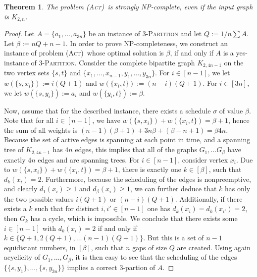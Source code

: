 \documentclass[10pt,a4paper]{article}
\newtheorem{theorem}{Theorem}[section]
\numberwithin{equation}{section}
\newcommand{\set}[1]{\{ #1 \}}
\newcommand{\fromto}[2]{\set{#1, \ldots, #2}}
\newcommand{\act}{\textsc{(Act)}}
\DeclareMathOperator{\val}{\text{value}}
\begin{document}
\begin{theorem}
The problem \act\ is strongly NP-complete, even if the input graph is $K_{2,n}$.
\end{theorem}
\begin{proof}
Let $A = \fromto{a_1}{a_{3n}}$ be an instance of \textsc{3-Partition} and let $Q := 1/n \sum A$. Let $\beta := nQ + n - 1$. In order to prove NP-completeness, we construct an instance of problem \act\ whose optimal solution is $\beta$, if and only if $A$ is a yes-instance of \textsc{3-Partition}. Consider the  complete bipartite graph $K_{2,4n-1}$ on the two vertex sets $\set{s, t}$ and $\set{x_1, \ldots, x_{n-1}, y_1, \ldots, y_{3n}}$. For $i \in [n-1]$, we let $w(\set{s,x_i}) := i(Q + 1)$ and $w(\set{x_i,t}) := (n - i)(Q + 1)$. For $i \in [3n]$, we let $w(\set{s,y_i}) := a_i$ and $w(\set{y_i,t}) := \beta$. 

Now, assume that for the described instance, there exists a schedule $\sigma$ of value $\beta$. Note that for all $i \in [n-1]$, we have $w(\set{s,x_i}) + w(\set{x_i,t}) = \beta + 1$, hence the sum of all weights is $(n-1)(\beta + 1) + 3n\beta + (\beta - n + 1) = \beta 4n$. Because the set of active edges is spanning at each point in time, and a spanning tree of $K_{2, 4n-1}$ has $4n$ edges, this implies that all of the graphs $G_1, \dots G_\beta$ have exactly $4n$ edges and are spanning trees. For $i \in [n-1
]$, consider vertex $x_i$.  Due to $w(\set{s,x_i}) + w(\set{x_i,t}) = \beta + 1$, there is exactly one $k \in [\beta]$, such that $d_k(x_i) = 2$. Furthermore, because the scheduling of the edges is nonpreemptive, and clearly $d_1(x_i) \geq 1$ and $d_\beta(x_i) \geq 1$, we can further deduce that $k$ has only the two possible values $i(Q+1)$ or $(n-i)(Q+1)$. Additionally, if there exists a $k$ such that for distinct $i, i' \in [n-1]$ one has $d_k(x_i) = d_k(x_{i'}) = 2$, then $G_k$ has a cycle, which is impossible. We conclude that there exists some $i \in [n-1]$ with $d_k(x_i) = 2$ if and only if $k \in \set{Q+1, 2(Q+1), \dots (n-1)(Q+1)}$. But this is a set of $n-1$ equidistant numbers, in $[\beta]$, such that $n$ gaps of size $Q$ are created. Using again acyclicity of $G_1, \dots, G_\beta$, it is then easy to see that the scheduling of the edges $\fromto{\set{s,y_1}}{\set{s,y_{3n}}}$ implies a correct 3-partion of $A$.



\end{proof}
\end{document}
